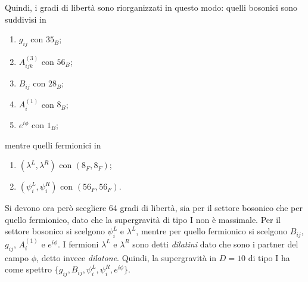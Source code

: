 Quindi, i gradi di libertà sono riorganizzati in questo modo: quelli bosonici sono suddivisi in 
\begin{enumerate}
    \item $g_{ij}$ con $35_B$;
    \item $A^{(3)}_{ijk}$ con $56_B$;
    \item $B_{ij}$ con $28_B$;
    \item $A_i^{(1)}$ con $8_B$;
    \item $e^{i\phi}$ con $1_B$;
\end{enumerate}
mentre quelli fermionici in 
\begin{enumerate}
    \item $(\lambda^L,\lambda^R)$ con $(8_F,8_F)$;
    \item $(\psi_i^L,\psi_i^R)$ con $(56_F,56_F)$.
\end{enumerate}
Si devono ora però scegliere 64 gradi di libertà, sia per il settore bosonico che per quello fermionico, dato che la supergravità di tipo I non è massimale. Per il settore bosonico si scelgono $\psi_i^L$ e $\lambda^L$, mentre per quello fermionico si scelgono $B_{ij}$, $g_{ij}$, $A_i^{(1)}$ e $e^{i\phi}$. I fermioni $\lambda^L$ e $\lambda^R$ sono detti \emph{dilatini} dato che sono i partner del campo $\phi$, detto invece \emph{dilatone}. Quindi, la supergravità in $D = 10$ di tipo I ha come spettro $\{g_{ij},B_{ij},\psi_i^L,\psi_i^R,e^{i\phi}\}$. 

